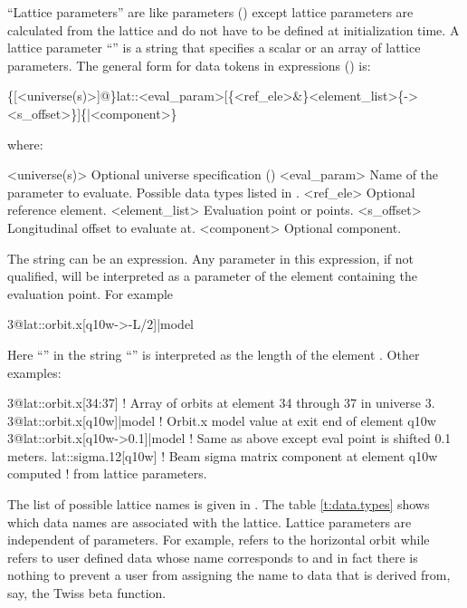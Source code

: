 ``Lattice parameters'' are like  parameters () except lattice parameters
are calculated from the lattice and do not have to be defined at initialization time.  A lattice
parameter ``'' is a string that specifies a scalar or an array of lattice parameters. The
general form for data tokens in expressions () is:
\begin{example}
  \{[<universe(s)>]@\}lat::<eval_param>[\{<ref_ele>&\}<element_list>\{-><s_offset>\}]\{|<component>\}
\end{example}
where:
\begin{example}
  <universe(s)>       Optional universe specification ()
  <eval_param>        Name of the parameter to evaluate. 
                        Possible data types listed in . 
  <ref_ele>           Optional reference element.
  <element_list>      Evaluation point or points.
  <s_offset>          Longitudinal offset to evaluate at.
  <component>         Optional component. 
\end{example}
The  string can be an expression. Any parameter in this expression, if not qualified,
will be interpreted as a parameter of the element containing the evaluation point. For example
\begin{example}
  3@lat::orbit.x[q10w->-L/2]|model
\end{example}
Here ``'' in the  string ``'' is interpreted as the length of the element
. Other examples:
\begin{example}
  3@lat::orbit.x[34:37]            ! Array of orbits at element 34 through 37 in universe 3.
  3@lat::orbit.x[q10w]|model       ! Orbit.x model value at exit end of element q10w
  3@lat::orbit.x[q10w->0.1]|model  ! Same as above except eval point is shifted 0.1 meters.
  lat::sigma.12[q10w]              ! Beam sigma matrix component at element q10w computed 
                                   !  from lattice parameters.
\end{example}

The list of possible lattice  names is given in . The table
\ref{t:data.types} shows which data names are associated with the lattice. Lattice parameters are
independent of  parameters. For example,  refers to the horizontal orbit
while  refers to user defined data whose name corresponds to  and in
fact there is nothing to prevent a user from assigning the name  to data that is derived
from, say, the Twiss beta function.

